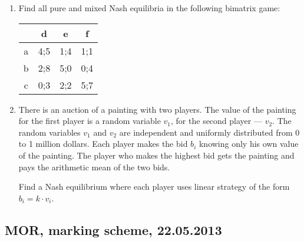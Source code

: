 \begin{enumerate}[resume]
\item Find all pure and mixed Nash equilibria in the following bimatrix game:


\begin{tabular}{c|ccc}
 & d & e & f \\
\hline
a & 4;5 & 1;4 & 1;1  \\
b & 2;8 & 5;0 & 0;4  \\
c & 0;3 & 2;2 & 5;7  \\
\end{tabular}


\item There is an auction of a painting with two players. The value of the painting for the first player is a random variable $v_1$, for the second player --- $v_2$. The random variables $v_1$ and $v_2$ are independent and uniformly distributed from 0 to 1 million dollars. Each player makes the bid $b_i$ knowing only his own value of the painting. The player who makes the highest bid gets the painting and pays the arithmetic mean of the two bids.

Find a Nash equilibrium where each player uses linear strategy of the form $b_i=k\cdot v_i$.

\end{enumerate}

\subsection{MOR, marking scheme, 22.05.2013 }

